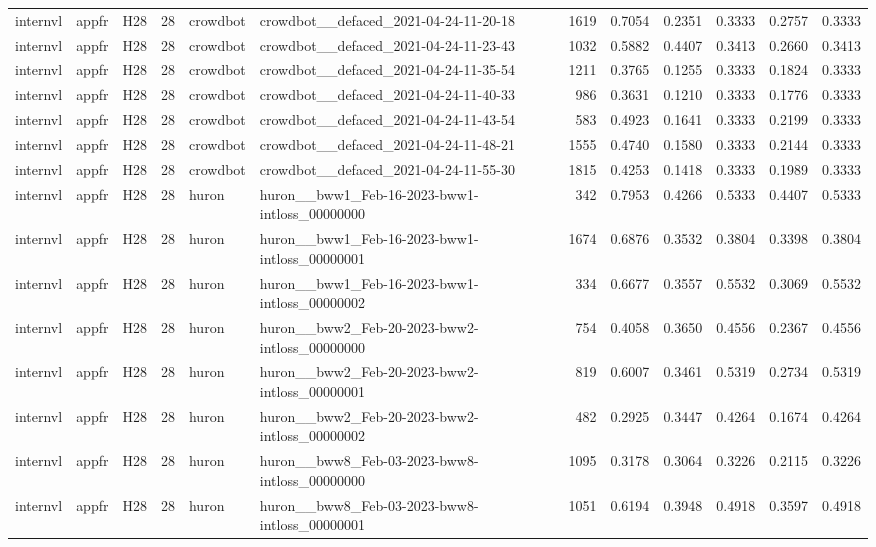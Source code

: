 \begin{table}[tbp]
\begin{tabular}{lllrllrrrrrr}
internvl & appfr & H28 & 28 & crowdbot & crowdbot\_\_defaced\_2021-04-24-11-20-18 & 1619 & 0.7054 & 0.2351 & 0.3333 & 0.2757 & 0.3333 \\
internvl & appfr & H28 & 28 & crowdbot & crowdbot\_\_defaced\_2021-04-24-11-23-43 & 1032 & 0.5882 & 0.4407 & 0.3413 & 0.2660 & 0.3413 \\
internvl & appfr & H28 & 28 & crowdbot & crowdbot\_\_defaced\_2021-04-24-11-35-54 & 1211 & 0.3765 & 0.1255 & 0.3333 & 0.1824 & 0.3333 \\
internvl & appfr & H28 & 28 & crowdbot & crowdbot\_\_defaced\_2021-04-24-11-40-33 & 986 & 0.3631 & 0.1210 & 0.3333 & 0.1776 & 0.3333 \\
internvl & appfr & H28 & 28 & crowdbot & crowdbot\_\_defaced\_2021-04-24-11-43-54 & 583 & 0.4923 & 0.1641 & 0.3333 & 0.2199 & 0.3333 \\
internvl & appfr & H28 & 28 & crowdbot & crowdbot\_\_defaced\_2021-04-24-11-48-21 & 1555 & 0.4740 & 0.1580 & 0.3333 & 0.2144 & 0.3333 \\
internvl & appfr & H28 & 28 & crowdbot & crowdbot\_\_defaced\_2021-04-24-11-55-30 & 1815 & 0.4253 & 0.1418 & 0.3333 & 0.1989 & 0.3333 \\
internvl & appfr & H28 & 28 & huron & huron\_\_bww1\_Feb-16-2023-bww1-intloss\_00000000 & 342 & 0.7953 & 0.4266 & 0.5333 & 0.4407 & 0.5333 \\
internvl & appfr & H28 & 28 & huron & huron\_\_bww1\_Feb-16-2023-bww1-intloss\_00000001 & 1674 & 0.6876 & 0.3532 & 0.3804 & 0.3398 & 0.3804 \\
internvl & appfr & H28 & 28 & huron & huron\_\_bww1\_Feb-16-2023-bww1-intloss\_00000002 & 334 & 0.6677 & 0.3557 & 0.5532 & 0.3069 & 0.5532 \\
internvl & appfr & H28 & 28 & huron & huron\_\_bww2\_Feb-20-2023-bww2-intloss\_00000000 & 754 & 0.4058 & 0.3650 & 0.4556 & 0.2367 & 0.4556 \\
internvl & appfr & H28 & 28 & huron & huron\_\_bww2\_Feb-20-2023-bww2-intloss\_00000001 & 819 & 0.6007 & 0.3461 & 0.5319 & 0.2734 & 0.5319 \\
internvl & appfr & H28 & 28 & huron & huron\_\_bww2\_Feb-20-2023-bww2-intloss\_00000002 & 482 & 0.2925 & 0.3447 & 0.4264 & 0.1674 & 0.4264 \\
internvl & appfr & H28 & 28 & huron & huron\_\_bww8\_Feb-03-2023-bww8-intloss\_00000000 & 1095 & 0.3178 & 0.3064 & 0.3226 & 0.2115 & 0.3226 \\
internvl & appfr & H28 & 28 & huron & huron\_\_bww8\_Feb-03-2023-bww8-intloss\_00000001 & 1051 & 0.6194 & 0.3948 & 0.4918 & 0.3597 & 0.4918 \\

\end{tabular}
\end{table}
